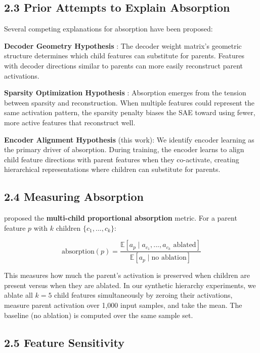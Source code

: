\documentclass{article}
\begin{document}
\subsection{2.3 Prior Attempts to Explain Absorption}

Several competing explanations for absorption have been proposed:

\textbf{Decoder Geometry Hypothesis} \citep{chanin2024absorption}: The decoder weight matrix's geometric structure determines which child features can substitute for parents. Features with decoder directions similar to parents can more easily reconstruct parent activations.

\textbf{Sparsity Optimization Hypothesis} \citep{korznikov2026sanity}: Absorption emerges from the tension between sparsity and reconstruction. When multiple features could represent the same activation pattern, the sparsity penalty biases the SAE toward using fewer, more active features that reconstruct well.

\textbf{Encoder Alignment Hypothesis} (this work): We identify encoder learning as the primary driver of absorption. During training, the encoder learns to align child feature directions with parent features when they co-activate, creating hierarchical representations where children can substitute for parents.

\subsection{2.4 Measuring Absorption}

\citet{chanin2024absorption} proposed the \textbf{multi-child proportional absorption} metric. For a parent feature $p$ with $k$ children $\{c_1, ..., c_k\}$:

$$\text{absorption}(p) = \frac{\mathbb{E}[a_p \mid a_{c_1}, ..., a_{c_k} \text{ ablated}]}{\mathbb{E}[a_p \mid \text{no ablation}]}$$

This measures how much the parent's activation is preserved when children are present versus when they are ablated. In our synthetic hierarchy experiments, we ablate all $k=5$ child features simultaneously by zeroing their activations, measure parent activation over 1,000 input samples, and take the mean. The baseline (no ablation) is computed over the same sample set.

\subsection{2.5 Feature Sensitivity}
\end{document}
